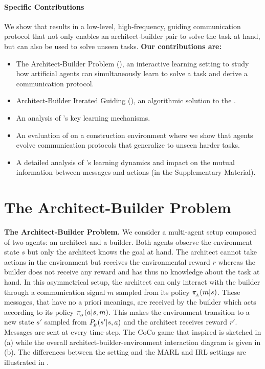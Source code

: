 \paragraph{Specific Contributions}
We show that \abig results in a low-level, high-frequency, guiding communication protocol that not only enables an architect-builder pair to solve the task at hand, but can also be used to solve unseen tasks.
\textbf{Our contributions are:} 
\begin{itemize}[noitemsep]
    \item The %
    Architect-Builder Problem (\abp), an interactive learning setting to study how %
    artificial agents can simultaneously learn to solve a task and derive a communication protocol. 
    \item Architect-Builder Iterated Guiding (\abig), an algorithmic solution to the \abp. 
    \item An analysis of \abig's key learning mechanisms. 
    \item An evaluation of \abig on a construction environment where we show that \abig agents evolve communication protocols that generalize to unseen harder tasks.
    \item A detailed analysis of \abig's learning dynamics and impact on the mutual information between messages and actions (in the Supplementary Material). 
\end{itemize}


\section{The Architect-Builder Problem}

\label{sec:prob_def_abp}
\textbf{The Architect-Builder Problem. } We consider a multi-agent setup composed of two agents: an architect and a builder. Both agents observe the environment state $s$ but only the architect knows the goal at hand. The architect cannot take actions in the environment but receives the environmental reward $r$ whereas the builder does not receive any reward and has thus no knowledge about the task at hand. In this asymmetrical setup, the architect can only interact with the builder through a communication signal $m$ sampled from its policy $\pi_{\!_A}(m|s)$. These messages, that have no a priori meanings, are received by the builder which acts according to its policy $\pi_{\!_B}(a|s,m)$. This makes the environment transition to a new state $s'$ sampled from $P_{\!_E}(s'|s,a)$ and the architect receives reward $r'$. Messages are sent at every time-step. The CoCo game that inspired \abp is sketched in (a) while the overall architect-builder-environment interaction diagram is given in (b). The differences between the \abp setting and the MARL and IRL settings are illustrated in .


